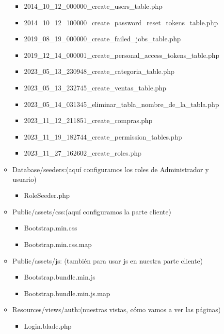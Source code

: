 \documentclass{article}
\begin{document}
\begin{enumerate}
\begin{itemize}
        \begin{itemize}
            \item 2014\_10\_12\_000000\_create\_users\_table.php
            \item 2014\_10\_12\_100000\_create\_password\_reset\_tokens\_table.php
            \item 2019\_08\_19\_000000\_create\_failed\_jobs\_table.php
            \item 2019\_12\_14\_000001\_create\_personal\_access\_tokens\_table.php
            \item 2023\_05\_13\_230948\_create\_categoria\_table.php
            \item 2023\_05\_13\_232745\_create\_ventas\_table.php
            \item 2023\_05\_14\_031345\_eliminar\_tabla\_nombre\_de\_la\_tabla.php
            \item 2023\_11\_12\_211851\_create\_compras.php
            \item 2023\_11\_19\_182744\_create\_permission\_tables.php
            \item 2023\_11\_27\_162602\_create\_roles.php
        \end{itemize}
    \item Database/seeders:(aquí configuramos los roles de Administrador y usuario) 
        \begin{itemize}
            \item RoleSeeder.php
        \end{itemize}
    \item Public/assets/css:(aquí configuramos la parte cliente)
        \begin{itemize}
            \item Bootstrap.min.css
            \item Bootstrap.min.css.map
        \end{itemize}
    \item Public/assets/js: (también para usar js en nuestra parte cliente)
        \begin{itemize}
            \item Bootstrap.bundle.min.js
            \item Bootstrap.bundle.min.js.map
        \end{itemize}
    \item Resources/views/auth:(nuestras vistas, cómo vamos a ver las páginas)
        \begin{itemize}
            \item Login.blade.php

\end{itemize}
\end{itemize}
\end{enumerate}
\end{document}
